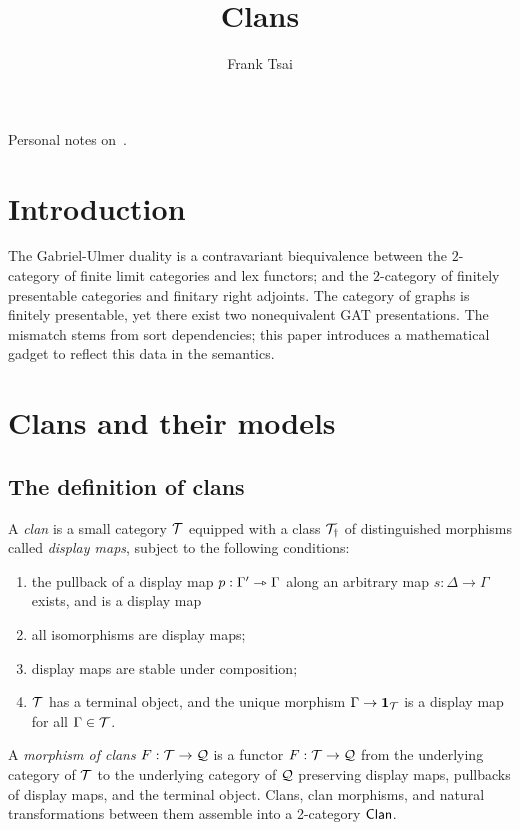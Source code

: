 \documentclass[a4paper]{article}
\title{Clans}
\author{Frank Tsai}
\begin{document}
\maketitle

Personal notes on~\cite{Frey25}.

\section{Introduction}
The Gabriel-Ulmer duality is a contravariant biequivalence between the $2$-category of finite limit categories and lex functors; and the $2$-category of finitely presentable categories and finitary right adjoints.
The category of graphs is finitely presentable, yet there exist two nonequivalent GAT presentations.
The mismatch stems from sort dependencies; this paper introduces a mathematical gadget to reflect this data in the semantics.

\section{Clans and their models}

\subsection{The definition of clans}
\begin{definition}
  A \emph{clan} is a small category $\mathcal{T}$ equipped with a class $\mathcal{T}_{\dag}$ of distinguished morphisms called \emph{display maps}, subject to the following conditions:
  \begin{enumerate}
  \item the pullback of a display map $p : \Gamma' \rightarrowtriangle \Gamma$ along an arbitrary map $s : \Delta \to \Gamma$ exists, and is a display map
    \begin{center}
    \end{center}
  \item all isomorphisms are display maps;
  \item display maps are stable under composition;
  \item $\mathcal{T}$ has a terminal object, and the unique morphism $\Gamma \to \mathbf{1}_{\mathcal{T}}$ is a display map for all $\Gamma \in \mathcal{T}$.
  \end{enumerate}
  A \emph{morphism of clans} $F : \mathcal{T} \to \mathcal{Q}$ is a functor $F : \mathcal{T} \to \mathcal{Q}$ from the underlying category of $\mathcal{T}$ to the underlying category of $\mathcal{Q}$ preserving display maps, pullbacks of display maps, and the terminal object.
  Clans, clan morphisms, and natural transformations between them assemble into a 2-category $\mathsf{Clan}$.
\end{definition}
\end{document}
